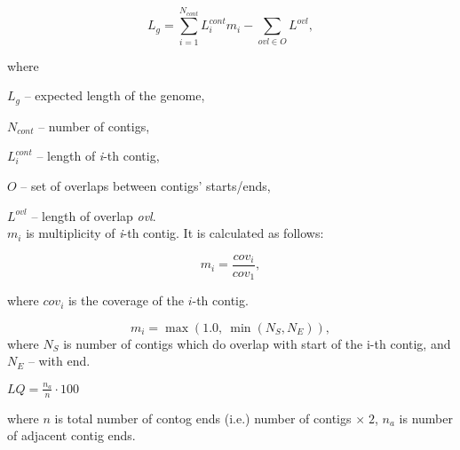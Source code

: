 \documentclass{article}
\begin{document}
	$$L_{g} = \sum_{i=1}^{N_{cont}} L_{i}^{cont} m_{i} - \sum_{ovl \in O} L^{ovl},$$
	
	where
	
	$L_{g}$ -- expected length of the genome,
	
	$N_{cont}$ -- number of contigs,
	
	$L_{i}^{cont}$ -- length of \textit{i}-th contig,
	
	$O$ -- set of overlaps between contigs' starts/ends,
	
	$L^{ovl}$ -- length of overlap \textit{ovl}.\\
	
	$m_{i}$ is multiplicity of \textit{i}-th contig. It is calculated as follows: 
	
	$$ m_{i} = \frac{cov_{i}}{cov_{1}}, $$
	
	where $ cov_{i} $ is the coverage of the $i$-th contig.

	\newpage

	$$m_{i} = \max(1.0, \: \min(N_{S}, N_{E})),$$  where $N_{S}$ is number of contigs which do overlap with start of the i-th contig, and $N_{E}$ -- with end.

	\newpage
	
	$LQ = \frac{n_{a}}{n} \cdot {100}$
	
where $n$ is total number of contog ends (i.e.) number of contigs $\times\;2$, $n_{a}$ is number of adjacent contig ends. 
	
	
	
\end{document}
